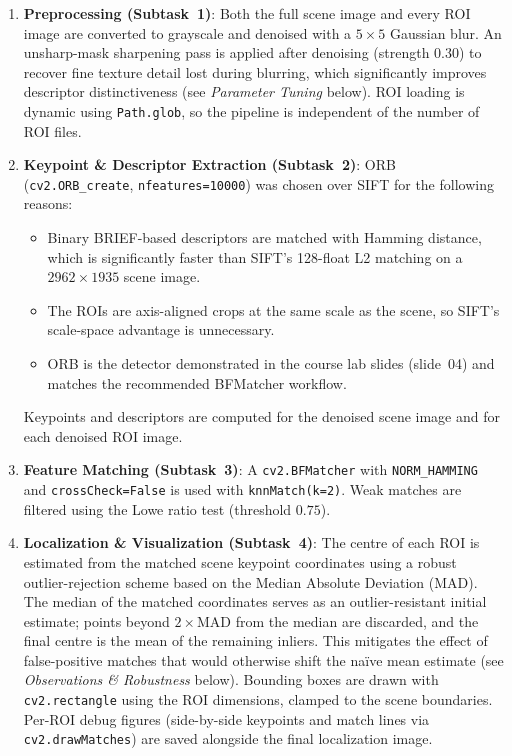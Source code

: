 \documentclass[11pt,a4paper]{article}
\begin{document}
\begin{enumerate}[leftmargin=*]
    \item \textbf{Preprocessing (Subtask~1)}:
        Both the full scene image and every ROI image are converted to grayscale and denoised with a $5\times5$ Gaussian blur.
        An unsharp-mask sharpening pass is applied after denoising (strength $0.30$) to recover fine texture detail lost during blurring, which significantly improves descriptor distinctiveness (see \textit{Parameter Tuning} below).
        ROI loading is dynamic using \texttt{Path.glob}, so the pipeline is independent of the number of ROI files.
    \item \textbf{Keypoint \& Descriptor Extraction (Subtask~2)}:
        ORB (\texttt{cv2.ORB\_create}, \texttt{nfeatures=10000}) was chosen over SIFT for the following reasons:
        \begin{itemize}[leftmargin=1.5em]
            \item Binary BRIEF-based descriptors are matched with Hamming distance, which is significantly faster than SIFT's 128-float L2 matching on a $2962\times1935$ scene image.
            \item The ROIs are axis-aligned crops at the same scale as the scene, so SIFT's scale-space advantage is unnecessary.
            \item ORB is the detector demonstrated in the course lab slides (slide~04) and matches the recommended BFMatcher workflow.
        \end{itemize}
        Keypoints and descriptors are computed for the denoised scene image and for each denoised ROI image.
    \item \textbf{Feature Matching (Subtask~3)}:
        A \texttt{cv2.BFMatcher} with \texttt{NORM\_HAMMING} and \texttt{crossCheck=False} is used with \texttt{knnMatch(k=2)}.
        Weak matches are filtered using the Lowe ratio test (threshold $0.75$).
    \item \textbf{Localization \& Visualization (Subtask~4)}:
        The centre of each ROI is estimated from the matched scene keypoint coordinates using a robust outlier-rejection scheme based on the Median Absolute Deviation (MAD).
        The median of the matched coordinates serves as an outlier-resistant initial estimate; points beyond $2\times\text{MAD}$ from the median are discarded, and the final centre is the mean of the remaining inliers.
        This mitigates the effect of false-positive matches that would otherwise shift the na\"ive mean estimate (see \textit{Observations \& Robustness} below).
        Bounding boxes are drawn with \texttt{cv2.rectangle} using the ROI dimensions, clamped to the scene boundaries.
        Per-ROI debug figures (side-by-side keypoints and match lines via \texttt{cv2.drawMatches}) are saved alongside the final localization image.
\end{enumerate}
\end{document}
